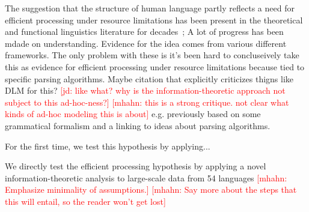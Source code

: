 \documentclass[12pt]{article}
\newcommand{\jd}[1]{\textcolor{Red}{[jd: #1]}}
\newcommand{\mhahn}[1]{\textcolor{Red}{[mhahn: #1]}}
\begin{document}
The suggestion that the structure of human language partly reflects a need for efficient processing under resource limitations has been present in the theoretical and functional linguistics literature for decades~\cite{berwick1984grammatical,hawkins1994performance};
A lot of progress has been mdade on understanding. Evidence for the idea comes from various different frameworks.
The only problem with these is it's been hard to concluseively take this as evidence for efficient processing under resource limitations because tied to specific parsing algorithms.
Maybe citation that explicitly criticizes thigns like DLM for this?
\jd{like what? why is the information-theoretic approach not subject to this ad-hoc-ness?}
\mhahn{this is a strong critique. not clear what kinds of ad-hoc modeling this is about}
e.g. previously based on some grammatical formalism and a linking to ideas about parsing algorithms.

For the first time, we test this hypothesis by applying...

We directly test the efficient processing hypothesis by applying a novel information-theoretic analysis to large-scale data from 54 languages
\mhahn{Emphasize minimality of assumptions.}
\mhahn{Say more about the steps that this will entail, so the reader won't get lost}




\end{document}
